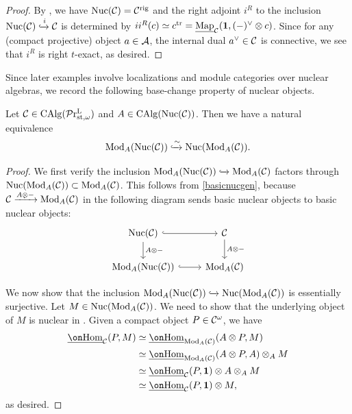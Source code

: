 \documentclass[a4paper,10pt, oneside]{amsart}
\begin{document}
	\begin{proof}
		By \cite[Proposition 1.30]{efimov2025localizinginvariantsinverselimits}, we have $\mathrm{Nuc}(\mathcal{C})=\mathcal{C}^{\mathrm{rig}}$ and the right adjoint $i^R$ to the inclusion $\mathrm{Nuc}(\mathcal{C})\xhookrightarrow{i} \mathcal{C}$ is determined by $ii^R(c) \simeq c^{\mathrm{tr}}=\underline{\operatorname{Map}}_{\mathcal{C}}(\mathbf{1},(-)^\vee\otimes c)$. Since for any (compact projective) object $a\in \mathcal{A}$, the internal dual $a^\vee\in\mathcal{C}$ is connective, we see that $i^R$ is right $t$-exact, as desired.
	\end{proof}
	Since later examples involve localizations and module categories over nuclear algebras, we record the following base-change property of nuclear objects.
	\begin{lem}\label{lemnucAmodule}
		Let $\mathcal{C}\in \operatorname{CAlg}(\mathcal{P}\mathrm{r}^\mathrm{L}_{\mathrm{st},\omega})$ and $A\in\operatorname{CAlg}(\mathrm{Nuc}(\mathcal{C}))$. Then we have a natural equivalence $$\operatorname{Mod}_A(\mathrm{Nuc}(\mathcal{C}))\xhookrightarrow{\sim} \mathrm{Nuc}(\operatorname{Mod}_A(\mathcal{C})).$$
	\end{lem}
	\begin{proof}
		We first verify the inclusion $\operatorname{Mod}_A(\mathrm{Nuc}(\mathcal{C}))\xhookrightarrow{} \operatorname{Mod}_A(\mathcal{C})$ factors through $ \mathrm{Nuc}(\operatorname{Mod}_A(\mathcal{C}))\subset \operatorname{Mod}_A(\mathcal{C})$.
		This follows from \cref{basicnucgen}, because
		$\mathcal{C}\xrightarrow{A\otimes-}\operatorname{Mod}_A(\mathcal{C})$ in the following diagram sends basic nuclear objects to basic nuclear objects:
		$$\begin{tikzcd}
			\nuc(\mcc) \arrow[r, hook] \arrow[d, "A\otimes-"] & \mcc \arrow[d, "A\otimes-"] \\
			\modu_A(\nuc(\mcc)) \arrow[r, hook]               & \modu_A(\mcc)              
		\end{tikzcd}$$
		
		We now show that the inclusion $\operatorname{Mod}_A(\mathrm{Nuc}(\mathcal{C}))\xhookrightarrow{} \mathrm{Nuc}(\operatorname{Mod}_A(\mathcal{C}))$ is essentially surjective. Let $M\in \mathrm{Nuc}(\operatorname{Mod}_A(\mathcal{C}))$. We need to show that the underlying object of $M$ is nuclear in \mcc. Given a compact object $P\in\mathcal{C}^\omega$, we have
		$$
		\begin{aligned}
			\underline{\Hom}_{\mcc}(P,M)
			&\simeq \underline{\Hom}_{\modu_A(\mcc)}(A\otimes P,M) \\
			&\simeq \underline{\Hom}_{\modu_A(\mcc)}(A\otimes P,A)\otimes_A M \\
			&\simeq \underline{\Hom}_{\mcc}(P,\mb{1})\otimes A\otimes_A M \\
			&\simeq \underline{\Hom}_{\mcc}(P,\mb{1})\otimes M,
		\end{aligned}
		$$
		as desired.
	\end{proof}
\end{document}
